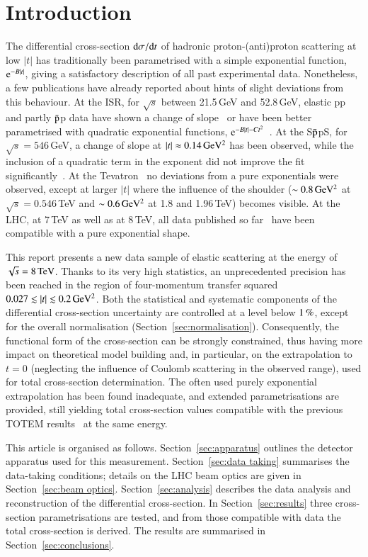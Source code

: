 \section{Introduction}
%
The differential cross-section ${\rm d} \sigma/{\rm d} t$ of hadronic proton-(anti)proton 
scattering at low $|t|$ has traditionally been parametrised with a simple 
exponential function, ${\rm e}^{-B |t|}$, giving a satisfactory description of 
all past experimental data.
Nonetheless, a few publications have already reported about hints of
slight deviations from this behaviour. At the ISR, for $\sqrt{s}$ 
between 21.5\,GeV and 52.8\,GeV, elastic pp and partly $\rm\bar{p}$p data have shown a 
change of slope~\cite{plb39,plb115} or have been better parametrised with quadratic 
exponential functions, ${\rm e}^{-B |t|-C t^2}$~\cite{npb141,npb248}. 
At the S$\rm\bar{p}$pS, for 
$\sqrt{s} = 546\,$GeV, a change of slope at $|t| \approx 0.14\,\rm GeV^{2}$ 
has been observed, while the inclusion of a quadratic term in the exponent did
not improve the fit significantly~\cite{plb147}. At the Tevatron~\cite{prl61,prl68,prd50,prd86} no 
deviations from a pure exponentials were observed, except at larger $|t|$ where
the influence of the shoulder ($\sim 0.8\,\rm GeV^{2}$ at 
$\sqrt{s} = 0.546$\,TeV and $\sim 0.6\,\rm GeV^{2}$ at 1.8 and 1.96\,TeV) 
becomes visible.
At the LHC, at 7\,TeV as well as at 8\,TeV, all data published so 
far~\cite{epl96,epl101-el,prl111,alfa} have been
compatible with a pure exponential shape.

This report presents a new data sample of elastic scattering at the energy of $\sqrt s = 8\,{\rm TeV}$. Thanks to its very high statistics,
an unprecedented precision has been reached in the region of four-momentum transfer squared $0.027 \lesssim |t| \lesssim 0.2\,{\rm GeV^2}$. Both the statistical and systematic components of the differential cross-section uncertainty are controlled 
at a level below $1\,{\rm \%}$, except for the overall normalisation 
(Section~\ref{sec:normalisation}). Consequently, the functional form of the cross-section can be strongly constrained, thus having more impact on theoretical model building and, in particular, on the extrapolation to $t=0$ (neglecting the influence of Coulomb scattering in the observed range), used for total cross-section determination. The often used purely exponential extrapolation has been found inadequate, and extended parametrisations are provided, still yielding total cross-section values compatible with the previous TOTEM results~\cite{prl111} at the same energy.

This article is organised as follows. Section~\ref{sec:apparatus} outlines the detector apparatus used for this measurement. Section~\ref{sec:data taking} summarises the data-taking conditions; details on the LHC beam optics are given in Section~\ref{sec:beam optics}. Section~\ref{sec:analysis} describes the data analysis and reconstruction of the differential cross-section. In Section~\ref{sec:results} three cross-section parametrisations are tested, and from those compatible with data the total cross-section is derived. The results are summarised in Section~\ref{sec:conclusions}.
